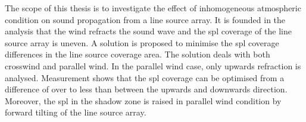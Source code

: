 {The scope of this thesis is to investigate the effect of inhomogeneous atmospheric condition on sound propagation from a line source array. It is founded in the analysis that the wind refracts the sound wave and the \gls{spl} coverage of the line source array is uneven. A solution is proposed to minimise the  \gls{spl} coverage differences in the line source coverage area. The solution deals with both crosswind and parallel wind. In the parallel wind case, only upwards refraction is analysed. Measurement shows that the \gls{spl} coverage can be optimised from a difference of over  to less than  between the upwards and downwards direction. Moreover, the \gls{spl} in the shadow zone is raised in parallel wind condition by forward tilting of the line source array.  

}

\newcommand{\projectSynopsis}{
Synopsis
}